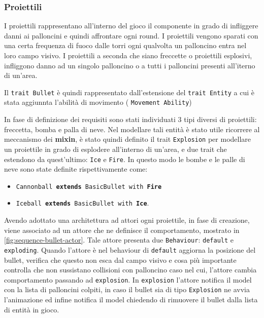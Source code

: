 \subsubsection{Proiettili}
I proiettili rappresentano all'interno del gioco il componente in grado di infliggere danni ai palloncini e quindi affrontare
ogni round. I proiettili vengono sparati con una certa frequenza di fuoco dalle torri ogni qualvolta un palloncino entra nel
loro campo visivo. I proiettili a seconda che siano freccette o proiettili esplosivi, infliggono danno ad un singolo palloncino
o a tutti i palloncini presenti all'iterno di un'area.

Il \texttt{trait Bullet} è quindi rappresentato dall'estensione del \texttt{trait Entity} a cui è stata aggiunnta
l'abilità di movimento ( \texttt{Movement Ability})

In fase di definizione dei requisiti sono stati individuati 3 tipi diversi di proiettili: freccetta, bomba e palla di neve.
Nel modellare tali entità è stato utile ricorrere al meccanismo dei \textbf{mixin}, è stato quindi definito il trait \texttt{Explosion}
per modellare un proiettile in grado di esplodere all'interno di un'area, e due trait che estendono da quest'ultimo:
\texttt{Ice} e \texttt{Fire}.
In questo modo le bombe e le palle di neve sono state definite rispettivamente come:
\begin{itemize}
    \item \texttt{Cannonball \textbf{extends} BasicBullet with \textbf{Fire}}
    \item \texttt{Iceball \textbf{extends} BasicBullet with \textbf{Ice}}.
\end{itemize}

Avendo adottato una architettura ad attori ogni proiettile, in fase di creazione, viene associato ad un attore che ne definisce
il comportamento, mostrato in \ref{fig:sequence-bullet-actor}. Tale attore presenta due \texttt{Behaviour}: \texttt{default} e \texttt{exploding}.
Quando l'attore è nel behaviour di \texttt{default} aggiorna la posizione del bullet, verifica che questo non esca dal campo visivo e
cosa più importante controlla che non sussistano collisioni con palloncino caso nel cui, l'attore cambia comportamento
passando ad \texttt{explosion}.
In \texttt{explosion} l'attore notifica il model con la lista di palloncini colpiti, in caso il bullet sia di tipo
\texttt{Explosion} ne avvia l'animazione ed infine notifica il model chiedendo di rimuovere il bullet dalla lista di entità
in gioco.


